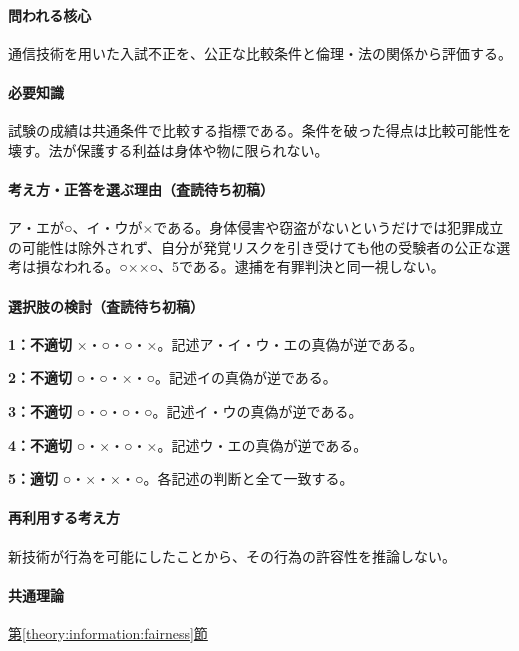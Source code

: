\paragraph{問われる核心} 通信技術を用いた入試不正を、公正な比較条件と倫理・法の関係から評価する。

\paragraph{必要知識} 試験の成績は共通条件で比較する指標である。条件を破った得点は比較可能性を壊す。法が保護する利益は身体や物に限られない。

\paragraph{考え方・正答を選ぶ理由（査読待ち初稿）} ア・エが○、イ・ウが×である。身体侵害や窃盗がないというだけでは犯罪成立の可能性は除外されず、自分が発覚リスクを引き受けても他の受験者の公正な選考は損なわれる。○××○、5である。逮捕を有罪判決と同一視しない。

\paragraph{選択肢の検討（査読待ち初稿）}\mbox{}\par

\noindent\textbf{1：不適切} ×・○・○・×。記述ア・イ・ウ・エの真偽が逆である。\par

\noindent\textbf{2：不適切} ○・○・×・○。記述イの真偽が逆である。\par

\noindent\textbf{3：不適切} ○・○・○・○。記述イ・ウの真偽が逆である。\par

\noindent\textbf{4：不適切} ○・×・○・×。記述ウ・エの真偽が逆である。\par

\noindent\textbf{5：適切} ○・×・×・○。各記述の判断と全て一致する。\par

\paragraph{再利用する考え方} 新技術が行為を可能にしたことから、その行為の許容性を推論しない。

\paragraph{共通理論} \hyperref[theory:information:fairness]{第\ref*{theory:information:fairness}節}

